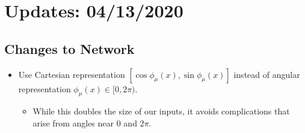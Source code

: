 \section{Updates: 04/13/2020}%
\label{sec:updates_2020_04_13}
%
\subsection{Changes to Network}%
\label{subsec:changes_to_network}
%
\begin{itemize}
  \item Use Cartesian representation \(\left[{\cos\phi_\mu(x),
    \sin\phi_\mu(x)}\right]\) instead of angular representation \(\phi_{\mu}(x)
    \in [{0, 2\pi})\).
    \begin{itemize}
      \item While this doubles the size of our inputs, it avoids complications
        that arise from angles near \(0\) and \(2\pi\).
    \end{itemize}
\end{itemize}

